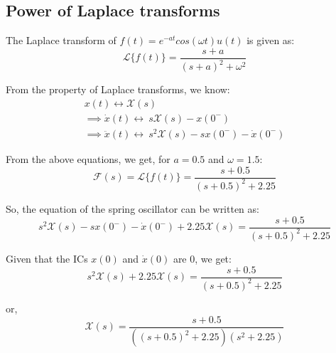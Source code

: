\documentclass[11pt, a4paper, twoside]{article}
\begin{document}
    \subsection{Power of Laplace transforms}
        The Laplace transform of $f(t) = e^{-at}cos(\omega t)u(t)$ is given as:
        \begin{equation*}
            \mathcal{L}\{f(t)\} = \frac{s+a}{(s+a)^2 + \omega^2}
        \end{equation*}

        From the property of Laplace transforms, we know:
        \begin{gather*}
            x(t) \longleftrightarrow \mathcal{X}(s)\\
            \implies \dot{x}(t) \longleftrightarrow \ s\mathcal{X}(s) - x(0^-)\\
            \implies \ddot{x}(t) \longleftrightarrow \ s^2\mathcal{X}(s) - sx(0^-)-\dot{x}(0^-)
        \end{gather*}

        From the above equations, we get, for $a = 0.5$ and $\omega = 1.5$:
        \begin{equation*}
            \mathcal{F}(s) = \mathcal{L}\{f(t)\} = \frac{s+0.5}{(s+0.5)^2+2.25}
        \end{equation*}

        So, the equation of the spring oscillator can be written as:
        \begin{equation*}
            s^2\mathcal{X}(s) - sx(0^-)-\dot{x}(0^-) + 2.25\mathcal{X}(s) = \frac{s+0.5}{(s+0.5)^2+2.25}
        \end{equation*}

        Given that the ICs $x(0)$ and $\dot{x}(0)$ are 0, we get:
        \begin{equation*}
            s^2\mathcal{X}(s) + 2.25\mathcal{X}(s) = \frac{s+0.5}{(s+0.5)^2+2.25}
        \end{equation*}

        or,
        \begin{equation*}
            \mathcal{X}(s) = \frac{s+0.5}{((s+0.5)^2+2.25)(s^2+2.25)}
        \end{equation*}
\end{document}
